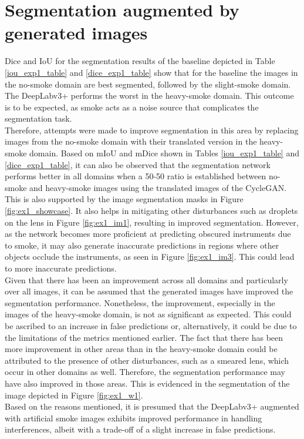 \section{Segmentation augmented by generated images}
Dice and IoU for the segmentation results of the baseline depicted in Table \ref{iou_exp1_table} and \ref{dice_exp1_table} show that for the baseline the images in the no-smoke domain are best segmented, followed by the slight-smoke domain. 
The DeepLabv3+ performs the worst in the heavy-smoke domain.
This outcome is to be expected, as smoke acts as a noise source that complicates the segmentation task.\\
Therefore, attempts were made to improve segmentation in this area by replacing images from the no-smoke domain with their translated version in the heavy-smoke domain.
Based on mIoU and mDice shown in Tables \ref{iou_exp1_table} and \ref{dice_exp1_table}, it can also be observed that the segmentation network performs better in all domains when a 50-50 ratio is established between no-smoke and heavy-smoke images using the translated images of the CycleGAN.
This is also supported by the image segmentation masks in Figure \ref{fig:ex1_showcase}.
It also helps in mitigating other disturbances such as droplets on the lens in Figure \ref{fig:ex1_im1}, resulting in improved segmentation.
However, as the network becomes more proficient at predicting obscured instruments due to smoke, it may also generate inaccurate predictions in regions where other objects occlude the instruments, as seen in Figure \ref{fig:ex1_im3}.
This could lead to more inaccurate predictions.\\
Given that there has been an improvement across all domains and particularly over all images, it can be assumed that the generated images have improved the segmentation performance.
Nonetheless, the improvement, especially in the images of the heavy-smoke domain, is not as significant as expected.
This could be ascribed to an increase in false predictions or, alternatively, it could be due to the limitations of the metrics mentioned earlier.
The fact that there has been more improvement in other areas than in the heavy-smoke domain could be attributed to the presence of other disturbances, such as a smeared lens, which occur in other domains as well. 
Therefore, the segmentation performance may have also improved in those areas.
This is evidenced in the segmentation of the image depicted in Figure \ref{fig:ex1_w1}.\\
Based on the reasons mentioned, it is presumed that the DeepLabv3+ augmented with artificial smoke images exhibits improved performance in handling interferences, albeit with a trade-off of a slight increase in false predictions.
